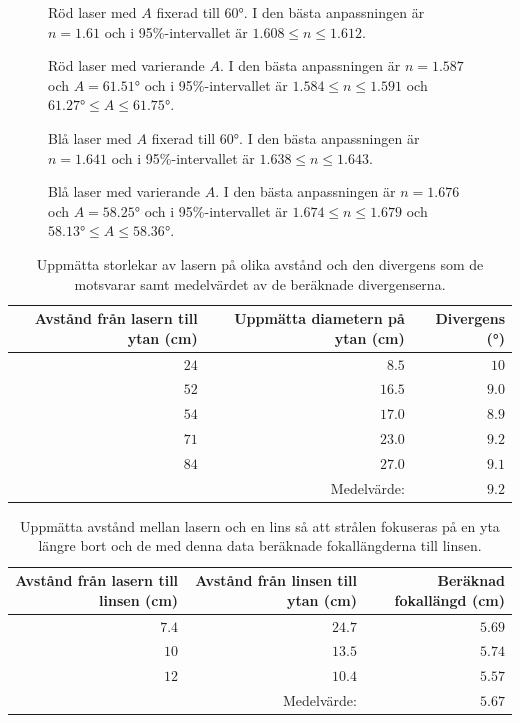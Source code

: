 \documentclass[a4paper]{article}
\begin{document}
\begin{figure}[h]
	\centering
	
	\caption{Röd laser med $A$ fixerad till $60°$. I den bästa anpassningen är $n=1.61$ och i 95\%-intervallet är $1.608\le n \le1.612$.}
	\label{fig:red60}
\end{figure}
\begin{figure}[h]
	\centering
	
	\caption{Röd laser med varierande $A$. I den bästa anpassningen är $n=1.587$ och $A=61.51°$ och i 95\%-intervallet är $1.584\le n \le1.591$ och $61.27°\le A \le61.75°$.}
	\label{fig:red}
\end{figure}
\begin{figure}[h]
	\centering
	
	\caption{Blå laser med $A$ fixerad till $60°$. I den bästa anpassningen är $n=1.641$ och i 95\%-intervallet är $1.638\le n \le1.643$.}
	\label{fig:blue60}
\end{figure}
\begin{figure}[h]
	\centering
	
	\caption{Blå laser med varierande $A$. I den bästa anpassningen är $n=1.676$ och $A=58.25°$ och i 95\%-intervallet är $1.674\le n \le1.679$ och $58.13°\le A \le58.36°$.}
	\label{fig:blue}
\end{figure}
\begin{table}[h]
	\centering
	\caption{Uppmätta storlekar av lasern på olika avstånd och den divergens som de motsvarar samt medelvärdet av de beräknade divergenserna.}
	\label{tab:div}
	\begin{tabular}{rrr}%
		\hline
		\hline
		Avstånd från lasern till ytan (cm) & Uppmätta diametern på ytan (cm) & Divergens (°) \\
		\hline
		$24$ & $8.5$ & $10$ \\
		$52$ & $16.5$ & $9.0$ \\
		$54$ & $17.0$ & $8.9$ \\
		$71$ & $23.0$ & $9.2$ \\
		$84$ & $27.0$ & $9.1$ \\
		& Medelvärde: & $9.2$ \\
		\hline
		\hline
	\end{tabular}
\end{table}
\begin{table}[h]
	\centering
	\caption{Uppmätta avstånd mellan lasern och en lins så att strålen fokuseras på en yta längre bort och de med denna data beräknade fokallängderna till linsen.}
	\label{tab:foc}
	\begin{tabular}{|r|r|r|}\hline %
		Avstånd från lasern till linsen (cm) & Avstånd från linsen till ytan (cm) & Beräknad fokallängd (cm) \\\hline
		$7.4$ & $24.7$ & $5.69$ \\\hline
		$10$ & $13.5$ & $5.74$ \\\hline
		$12$ & $10.4$ & $5.57$ \\\hline
		& Medelvärde: & $5.67$ \\\hline
	\end{tabular}
\end{table}
\end{document}
